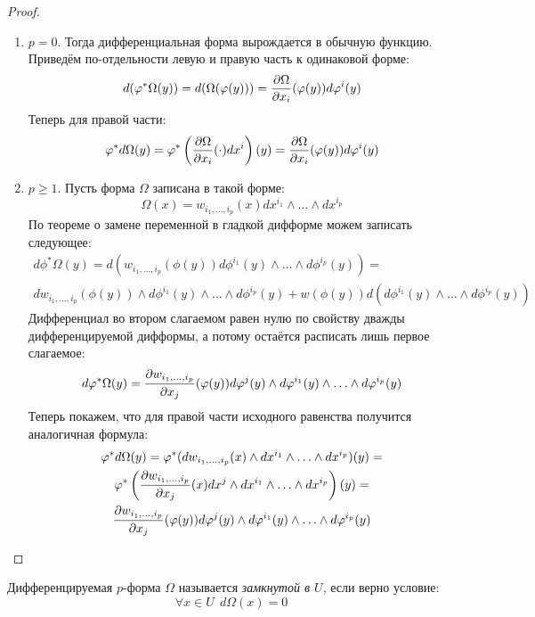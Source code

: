 \begin{proof}~
	\begin{enumerate}
		\item $p = 0$. Тогда дифференциальная форма вырождается в обычную функцию. Приведём по-отдельности левую и правую часть к одинаковой форме:
		\[
			d(\varphi^*\Omega(y)) = d(\Omega(\varphi(y))) = \frac{\partial \Omega}{\partial x_i}(\varphi(y)) d\varphi^i(y)
		\]
		Теперь для правой части:
		\[
			\varphi^*d\Omega(y) = \varphi^*\left(\frac{\partial \Omega}{\partial x_i}(\cdot)dx^i\right)(y) = \frac{\partial \Omega}{\partial x_i}(\varphi(y)) d\varphi^i(y)
		\]
		
		\item $p \ge 1$. Пусть форма $\Omega$ записана в такой форме:
		\[
			\Omega(x) = w_{i_1, \ldots, i_p}(x) dx^{i_1} \wedge \ldots \wedge dx^{i_p}
		\]
		По теореме о замене переменной в гладкой дифформе можем записать следующее:
		\begin{multline*}
			d\phi^*\Omega(y) = d(w_{i_1, \ldots, i_p}(\phi(y))d\phi^{i_1}(y) \wedge \ldots \wedge d\phi^{i_p}(y)) =
			\\
			dw_{i_1, \ldots, i_p}(\phi(y)) \wedge d\phi^{i_1}(y) \wedge \ldots \wedge d\phi^{i_p}(y) + w(\phi(y))d(d\phi^{i_1}(y) \wedge \ldots \wedge d\phi^{i_p}(y))
		\end{multline*}
		Дифференциал во втором слагаемом равен нулю по свойству дважды дифференцируемой дифформы, а потому остаётся расписать лишь первое слагаемое:
		\[
			d\varphi^*\Omega(y) = \frac{\partial w_{i_1, \ldots, i_p}}{\partial x_j} (\varphi(y)) d\varphi^j(y) \wedge d\varphi^{i_1}(y) \wedge \ldots \wedge d\varphi^{i_p}(y)
		\]
		Теперь покажем, что для правой части исходного равенства получится аналогичная формула:
		\begin{multline*}
			\varphi^*d\Omega(y) = \varphi^*(dw_{i_1, \ldots, i_p}(x) \wedge dx^{i_1} \wedge \ldots \wedge dx^{i_p})(y) =
			\\
			\varphi^*\left(\frac{\partial w_{i_1, \ldots, i_p}}{\partial x_j}(x) dx^j \wedge dx^{i_1} \wedge \ldots \wedge dx^{i_p}\right)(y) =
			\\
			\frac{\partial w_{i_1, \ldots, i_p}}{\partial x_j}(\varphi(y)) d\varphi^j(y) \wedge d\varphi^{i_1}(y) \wedge \ldots \wedge d\varphi^{i_p}(y)
		\end{multline*}
	\end{enumerate}
\end{proof}

\begin{definition}
	Дифференцируемая $p$-форма $\Omega$ называется \textit{замкнутой в $U$}, если верно условие:
	\[
		\forall x \in U\ \ d\Omega(x) = 0
	\]
\end{definition}

